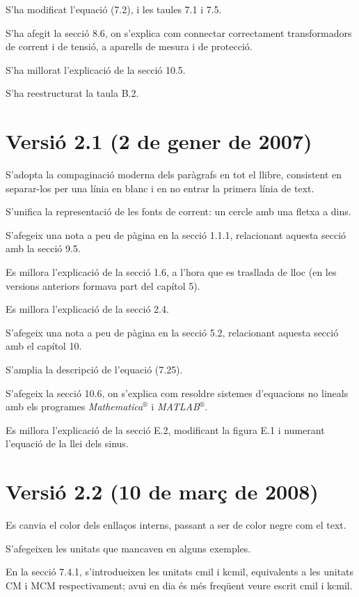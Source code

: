 S'ha modificat l'equació (7.2),
i les taules 7.1 i 7.5.

S'ha afegit la secció 8.6, on s'explica com
connectar correctament transformadors de corrent i de tensió, a
aparells de mesura i de protecció.

S'ha millorat l'explicació de la secció 10.5.

S'ha reestructurat la taula B.2.

\section*{Versió 2.1 (2 de gener de 2007)}

S'adopta la compaginació moderna dels paràgrafs en tot el llibre, consistent en separar-los per una línia en blanc i en no entrar la primera línia de text.

S'unifica la representació de les fonts de corrent: un cercle amb una fletxa a dins.

S'afegeix una nota a peu de pàgina en la secció 1.1.1, relacionant aquesta secció amb la secció 9.5.

Es millora l'explicació de la secció 1.6, a l'hora que es trasllada de lloc (en les versions anteriors formava part del capítol 5).

Es millora l'explicació de la secció 2.4.

S'afegeix una nota a peu de pàgina en la secció 5.2, relacionant aquesta secció amb el capítol 10.

S'amplia la descripció de l'equació (7.25).

S'afegeix la secció 10.6, on s'explica com resoldre sistemes d'equacions no lineals amb els programes \textit{Mathematica}${}^\circledR$ i \textit{MATLAB}${}^\circledR$.

Es millora l'explicació de la secció E.2, modificant la figura E.1 i numerant l'equació de la llei dels sinus.

\section*{Versió 2.2 (10 de març de 2008)}

Es canvia el color dels enllaços interns, passant a ser de color negre com el text.

S'afegeixen les unitats que mancaven en alguns exemples.

En la secció 7.4.1, s'introdueixen les unitats cmil i kcmil, equivalents a les unitats CM i MCM respectivament; avui en dia és més freqüent veure escrit cmil i kcmil.

